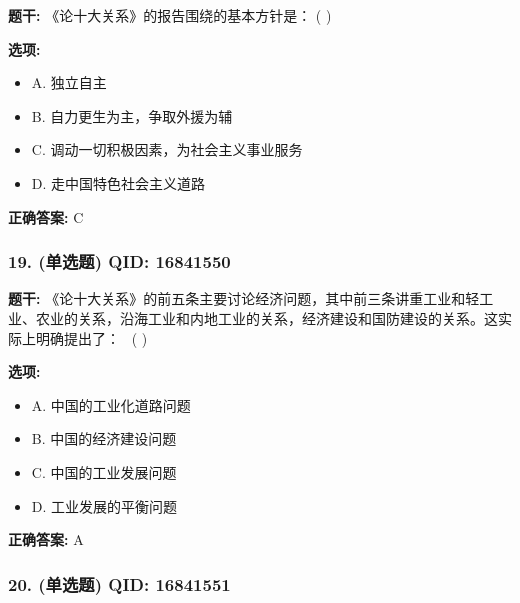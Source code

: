 \documentclass[12pt,UTF8]{ctexart}
\begin{document}
\textbf{题干:}
《论十大关系》的报告围绕的基本方针是： ( )

\textbf{选项:}
\begin{itemize}[leftmargin=*]

  \item A. 独立自主

  \item B. 自力更生为主，争取外援为辅

  \item C. 调动一切积极因素，为社会主义事业服务

  \item D. 走中国特色社会主义道路

\end{itemize}

\textbf{正确答案:}
C

\vspace{0.3em}\hrulefill\vspace{0.7em}

\subsubsection*{19. (单选题) \small QID: 16841550}

\textbf{题干:}
《论十大关系》的前五条主要讨论经济问题，其中前三条讲重工业和轻工业、农业的关系，沿海工业和内地工业的关系，经济建设和国防建设的关系。这实际上明确提出了：  ( )

\textbf{选项:}
\begin{itemize}[leftmargin=*]

  \item A. 中国的工业化道路问题

  \item B. 中国的经济建设问题

  \item C. 中国的工业发展问题

  \item D. 工业发展的平衡问题

\end{itemize}

\textbf{正确答案:}
A

\vspace{0.3em}\hrulefill\vspace{0.7em}

\subsubsection*{20. (单选题) \small QID: 16841551}
\end{document}
